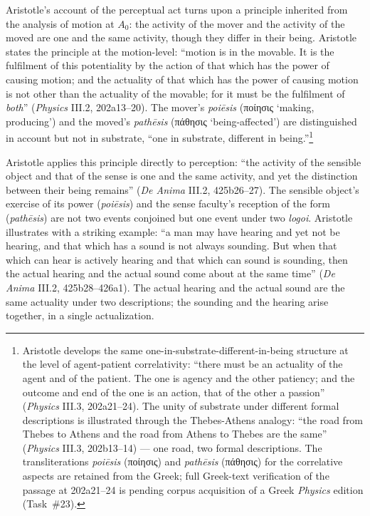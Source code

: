 \documentclass{article}
\newcommand{\gk}[1]{{\greekfont #1}}
\begin{document}
Aristotle's account of the perceptual act turns upon a principle inherited from the analysis of motion at $A_0$: the activity of the mover and the activity of the moved are one and the same activity, though they differ in their being. Aristotle states the principle at the motion-level: ``motion is in the movable. It is the fulfilment of this potentiality by the action of that which has the power of causing motion; and the actuality of that which has the power of causing motion is not other than the actuality of the movable; for it must be the fulfilment of \textit{both}'' (\textit{Physics} III.2, 202a13--20). The mover's \textit{poiēsis} (\gk{ποίησις} `making, producing') and the moved's \textit{pathēsis} (\gk{πάθησις} `being-affected') are distinguished in account but not in substrate, ``one in substrate, different in being.''\footnote{Aristotle develops the same one-in-substrate-different-in-being structure at the level of agent-patient correlativity: ``there must be an actuality of the agent and of the patient. The one is agency and the other patiency; and the outcome and end of the one is an action, that of the other a passion'' (\textit{Physics} III.3, 202a21--24). The unity of substrate under different formal descriptions is illustrated through the Thebes-Athens analogy: ``the road from Thebes to Athens and the road from Athens to Thebes are the same'' (\textit{Physics} III.3, 202b13--14) --- one road, two formal descriptions. The transliterations \textit{poiēsis} (\gk{ποίησις}) and \textit{pathēsis} (\gk{πάθησις}) for the correlative aspects are retained from the Greek; full Greek-text verification of the passage at 202a21--24 is pending corpus acquisition of a Greek \textit{Physics} edition (Task~\#23).}

Aristotle applies this principle directly to perception: ``the activity of the sensible object and that of the sense is one and the same activity, and yet the distinction between their being remains'' (\textit{De Anima} III.2, 425b26--27). The sensible object's exercise of its power (\textit{poiēsis}) and the sense faculty's reception of the form (\textit{pathēsis}) are not two events conjoined but one event under two \textit{logoi}. Aristotle illustrates with a striking example: ``a man may have hearing and yet not be hearing, and that which has a sound is not always sounding. But when that which can hear is actively hearing and that which can sound is sounding, then the actual hearing and the actual sound come about at the same time'' (\textit{De Anima} III.2, 425b28--426a1). The actual hearing and the actual sound are the same actuality under two descriptions; the sounding and the hearing arise together, in a single actualization.
\end{document}
